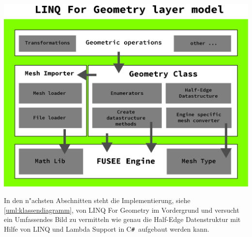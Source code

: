 \documentclass[pagesize, paper=a4, fontsize=12pt,titlepage=true, headings=small, headnosepline, abstractoff, liststotoc, nochapterprefix, plainheadsepline]{scrreprt}
\newcommand{\CSS}{C\texttt{\# }}
\newcommand{\LFGS}{LINQ For Geometry }
\newcommand{\HES}{Half-Edge Datenstruktur }
\begin{document}
\includegraphics[width=\linewidth]{../Bilder/LFGLayer}
\label{pic:LFGLayer} 


In den n"achsten Abschnitten steht die Implementierung, siehe \ref{uml:klassendiagramm}, von \LFGS im Vordergrund und versucht ein Umfassendes Bild zu vermitteln wie genau die \HES mit Hilfe von LINQ und Lambda Support in \CSS aufgebaut werden kann.
\newline
\end{document}
